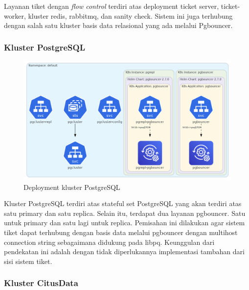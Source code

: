 Layanan tiket dengan \textit{flow control} terdiri atas deployment ticket server, ticket-worker, kluster redis, rabbitmq, dan sanity check. Sistem ini juga terhubung dengan salah satu kluster basis data relasional yang ada melalui Pgbouncer.

\pagebreak

\subsubsection{Kluster PostgreSQL}

\begin{figure}[htbp]
    \centering
    \includegraphics[width=1\textwidth]{resources/chapter-4/postgres.png}
    \caption{Deployment kluster PostgreSQL}
    \label{fig:deployment-postgres}
\end{figure}

Kluster PostgreSQL terdiri atas stateful set PostgreSQL yang akan terdiri atas satu primary dan satu replica. Selain itu, terdapat dua layanan pgbouncer. Satu untuk primary dan satu lagi untuk replica. Pemisahan ini dilakukan agar sistem tiket dapat terhubung dengan basis data melalui pgbouncer dengan multihost connection string sebagaimana didukung pada libpq. Keunggulan dari pendekatan ini adalah dengan tidak diperlukannya implementasi tambahan dari sisi sistem tiket.

\pagebreak

\subsubsection{Kluster CitusData}

